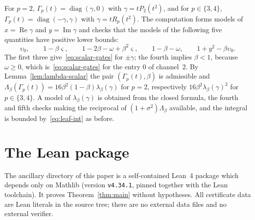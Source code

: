 \documentclass[11pt,reqno]{amsart}
\theoremstyle{definition}
\numberwithin{equation}{section}
\DeclareMathOperator{\RePart}{Re}
\DeclareMathOperator{\ImPart}{Im}
\DeclareMathOperator{\diag}{diag}
\begin{document}
For $p=2$, $\Gamma_p(t)=\diag(\gamma,0)$ with $\gamma=tP_2(t^2)$, and for $p\in\{3,4\}$, $\Gamma_p(t)=\diag(-\gamma,\gamma)$ with $\gamma=tR_p(t^2)$. The computation forms models of $x=\RePart\gamma$ and $y=\ImPart\gamma$ and checks that the models of the following five quantities have positive lower bounds:
\[
  \upsilon_0,\qquad1-\beta\varsigma,\qquad1-2\beta-\omega+\beta^2\varsigma,\qquad1-\beta-\omega,\qquad1+y^2-\beta\upsilon_0 .
\]
The first three give~\eqref{eq:scalar-gates} for $\pm\gamma$; the fourth implies $\beta<1$, because $\omega\ge0$, which is~\eqref{eq:scalar-gates} for the entry $0$ of channel~$2$. By Lemma~\ref{lem:lambda-scalar} the pair $(\Gamma_p(t),\beta)$ is admissible and $\Lambda_\beta(\Gamma_p(t))=16\beta^2(1-\beta)\lambda_\beta(\gamma)$ for $p=2$, respectively $16\beta^2\lambda_\beta(\gamma)^2$ for $p\in\{3,4\}$. A model of $\lambda_\beta(\gamma)$ is obtained from the closed formula, the fourth and fifth checks making the reciprocal of $(1+\sigma^2)\Lambda_\beta$ available, and the integral is bounded by~\eqref{eq:leaf-int} as before.

\section{The Lean package}\label{app:lean}

The ancillary directory  of this paper is a self-contained Lean~4 package which depends only on Mathlib (version \texttt{v4.34.1}, pinned together with the Lean toolchain). It proves Theorem~\ref{thm:main} without hypotheses. All certificate data are Lean literals in the source tree; there are no external data files and no external verifier.
\end{document}
